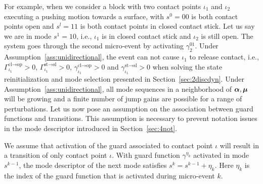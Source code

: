 \documentclass[../DC2017114Bouma.tex]{subfiles}
\begin{document}
For example, when we consider a block with two contact points $\iota_1$ and $\iota_2$ executing a pushing motion towards a surface, with $s^0 = 00$ is both contact points open and $s^l = 11$ is both contact points in closed contact stick. Let us say we are in mode $s^1 = 10$, i.e., $\iota_1$ is in closed contact stick and $\iota_2$ is still open. The system goes through the second micro-event by activating $\gamma^{01}_2$. Under Assumption~\ref{ass:unidirectional}, the event can not cause $\iota_1$ to release contact, i.e., $\Gamma_{\iota_1}^{\text{cl}\rightarrow\text{op}}>0$, $\Gamma_{\iota_1}^{\text{st}\rightarrow\text{sl}}>0$, $\gamma_{\iota_1}^{\text{cl}\rightarrow\text{op}}>0$ and $\gamma_{\iota_1}^{\text{st}\rightarrow\text{sl}}>0$ when solving the state reinitialization and mode selection presented in Section~\ref{sec:2discdyn}. Under Assumption~\ref{ass:unidirectional}, all mode sequences in a neighborhood of $\boldsymbol{\alpha},\boldsymbol{\mu}$ will be growing and a finite number of jump gains are possible for a range of perturbations. Let us now pose an assumption on the association between guard functions and transitions. This assumption is necessary to prevent notation issues in the mode descriptor introduced in Section~\ref{sec:4not}.

\begin{myass}\label{ass:guardtrans}
We assume that activation of the guard associated to contact point $\iota$ will result in a transition of only contact point $\iota$. With guard function $\gamma^{\eta_k}$ activated in mode $s^{k-1}$, the mode descriptor of the next mode satisfies $s^{k} = s^{k-1} + \eta_k$. Here $\eta_k$ is the index of the guard function that is activated during micro-event $k$.
\end{myass}
\end{document}
